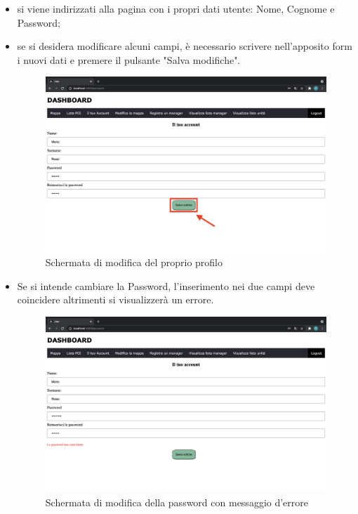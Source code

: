 \begin{itemize}
    \item si viene indirizzati alla pagina con i propri dati utente: Nome, Cognome e Password;
    \item se si desidera modificare alcuni campi, è necessario scrivere nell'apposito form i nuovi dati e premere il pulsante "Salva modifiche".
    \begin{figure}[H]
        \centering
        \includegraphics[scale=0.12]{res/images/account_user.png}
        \caption{Schermata di modifica del proprio profilo}
    \end{figure}
    \item Se si intende cambiare la Password, l'inserimento nei due campi deve coincidere altrimenti si visualizzerà un errore.
    \begin{figure}[H]
        \centering
        \includegraphics[scale=0.12]{res/images/account_errore.png}
        \caption{Schermata di modifica della password con messaggio d'errore}
    \end{figure}
\end{itemize}


